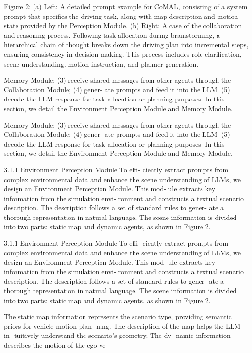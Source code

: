 \documentclass[12pt]{article}
\begin{document}
Figure 2: (a) Left: A detailed prompt example for CoMAL, consisting of a system prompt that specifies the
driving task, along with map description and motion state provided by the Perception Module. (b) Right: A case
of the collaboration and reasoning process. Following task allocation during brainstorming, a hierarchical chain
of thought breaks down the driving plan into incremental steps, ensuring consistency in decision-making. This
process includes role clarification, scene understanding, motion instruction, and planner generation.


Memory Module; (3) receive shared messages from other
agents through the Collaboration Module; (4) gener-
ate prompts and feed it into the LLM; (5) decode the
LLM response for task allocation or planning purposes.
In this section, we detail the Environment Perception
Module and Memory Module.


Memory Module; (3) receive shared messages from other
agents through the Collaboration Module; (4) gener-
ate prompts and feed it into the LLM; (5) decode the
LLM response for task allocation or planning purposes.
In this section, we detail the Environment Perception
Module and Memory Module.


3.1.1 Environment Perception Module To effi-
ciently extract prompts from complex environmental
data and enhance the scene understanding of LLMs, we
design an Environment Perception Module. This mod-
ule extracts key information from the simulation envi-
ronment and constructs a textual scenario description.
The description follows a set of standard rules to gener-
ate a thorough representation in natural language. The
scene information is divided into two parts: static map
and dynamic agents, as shown in Figure 2.


3.1.1 Environment Perception Module To effi-
ciently extract prompts from complex environmental
data and enhance the scene understanding of LLMs, we
design an Environment Perception Module. This mod-
ule extracts key information from the simulation envi-
ronment and constructs a textual scenario description.
The description follows a set of standard rules to gener-
ate a thorough representation in natural language. The
scene information is divided into two parts: static map
and dynamic agents, as shown in Figure 2.


The static map information represents the scenario
type, providing semantic priors for vehicle motion plan-
ning. The description of the map helps the LLM in-
tuitively understand the scenario’s geometry. The dy-
namic information describes the motion of the ego ve-
\end{document}
